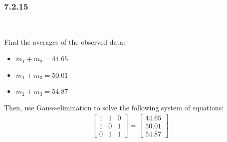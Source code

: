 \subsubsection{7.2.15}\hfill\\\par
\noindent Find the averages of the observed data:\par
\begin{itemize}
  \item $m_1+m_2 = 44.65$
  \item $m_1+m_3 = 50.01$
  \item $m_2+m_3 = 54.87$
\end{itemize}
\par\bigskip
\noindent Then, use Gauss-elimination to solve the following system of equations:
\begin{equation*}
  \begin{gathered}
    \begin{bmatrix}1&1&0\\1&0&1\\0&1&1\end{bmatrix}=\begin{bmatrix}44.65\\50.01\\54.87\end{bmatrix}
  \end{gathered}
\end{equation*}
